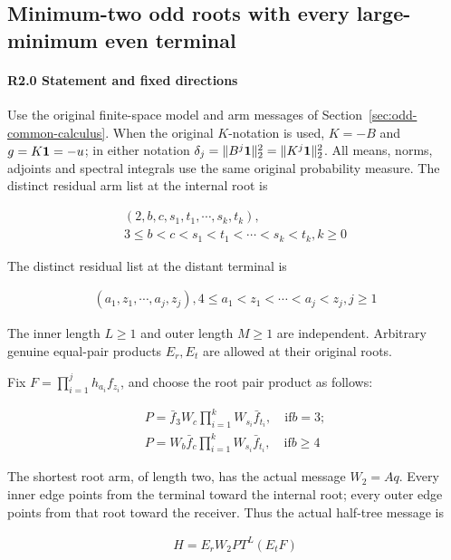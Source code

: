 \subsection{Minimum-two odd roots with every large-minimum even terminal}\label{proof:R2-C002}
\paragraph{R2.0 Statement and fixed directions}

Use the original finite-space model and arm messages of
Section~\ref{sec:odd-common-calculus}.
When the original \(K\)-notation is used, \(K=-B\) and
\(g=K\mathbf1=-u\); in either notation
\(\delta_j=\|B^j\mathbf1\|_2^2=\|K^j\mathbf1\|_2^2\).
All means, norms, adjoints and spectral integrals use the same
original probability measure.
The distinct residual arm list at the internal root is

\[
\begin{gathered}
(2,b,c,s_1,t_1,\cdots,s_k,t_k),\\
3\le b<c<s_1<t_1<\cdots<s_k<t_k,k\ge 0
\end{gathered}
\]

The distinct residual list at the distant terminal is

\[
\begin{gathered}
(a_1,z_1,\cdots,a_j,z_j),4\le a_1<z_1<\cdots<a_j<z_j,j\ge 1
\end{gathered}
\]

The inner length \(L\ge1\) and outer length \(M\ge1\) are independent. Arbitrary genuine equal-pair products \(E_r,\allowbreak \allowbreak  E_t\) are allowed at their original roots.

Fix \(F=\prod_{i=1}^j h_{a_i}f_{z_i}\), and choose the root pair product as follows:

\[
\begin{gathered}
P=\bar f_3 W_c \prod_{i=1}^{k} W_{s_i}\bar f_{t_i},\quad\text{if} b=3;\\
P=W_b \bar f_c \prod_{i=1}^{k} W_{s_i}\bar f_{t_i},\quad\text{if} b\ge 4
\end{gathered}
\]

The shortest root arm, of length two, has the actual message \(W_2=Aq\). Every inner edge points from the terminal toward the internal root; every outer edge points from that root toward the receiver. Thus the actual half-tree message is

\[
\begin{gathered}
H=E_r W_2 P T^L(E_t F)
\end{gathered}
\]

